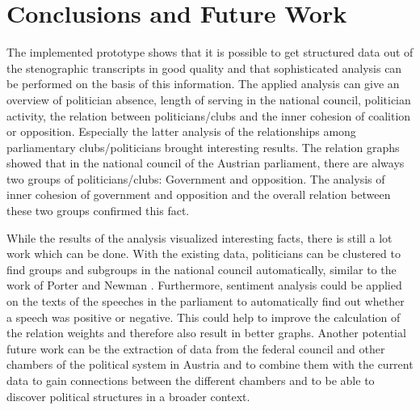 \chapter{Conclusions and Future Work}
\label{chap:conclusion}

The implemented prototype shows that it is possible to get structured data out of the stenographic transcripts in good quality and that sophisticated analysis can be performed on the basis of this information. The applied analysis can give an overview of politician absence, length of serving in the national council, politician activity, the relation between politicians/clubs and the inner cohesion of coalition or opposition. Especially the latter analysis of the relationships among parliamentary clubs/politicians brought interesting results. The relation graphs showed that in the national council of the Austrian parliament, there are always two groups of politicians/clubs: Government and opposition. The analysis of inner cohesion of government and opposition and the overall relation between these two groups confirmed this fact.

While the results of the analysis visualized interesting facts, there is still a lot work which can be done. With the existing data, politicians can be clustered to find groups and subgroups in the national council automatically, similar to the work of Porter and Newman \cite{Porter_2005}. Furthermore, sentiment analysis could be applied on the texts of the speeches in the parliament to automatically find out whether a speech was positive or negative. This could help to improve the calculation of the relation weights and therefore also result in better graphs. Another potential future work can be the extraction of data from the federal council and other chambers of the political system in Austria and to combine them with the current data to gain connections between the different chambers and to be able to discover political structures in a broader context.